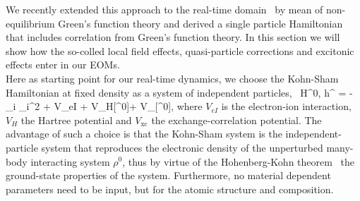 We recently extended this approach to the real-time domain~\cite{attaccalite} by mean of non-equilibrium Green's function theory and derived a single particle Hamiltonian that includes correlation from Green's function theory. %
In this section we will show how the so-colled local field effects, quasi-particle corrections and excitonic effects enter in our EOMs.\\
Here as starting point for our real-time dynamics, we choose the Kohn-Sham  Hamiltonian at fixed density as a system of independent particles,~\cite{PhysRev.140.A1133} 
\be
\hat H^{0,} \equiv \hat h^{} = -\sum_{i} \nabla_i^2 + \hat V_{eI} + \hat V_{H}[\rho^0]+ \hat V_{}[\rho^0],      
\label{eq:HIPA}
\ee
where $V_{eI}$ is the electron-ion interaction, $V_{H}$ the Hartree potential and $V_{\text{xc}}$ the exchange-correlation potential.
The advantage of such a choice is that the Kohn-Sham system is the independent-particle system that reproduces the electronic density of the unperturbed many-body interacting system $\rho^0$, thus by virtue of the Hohenberg-Kohn theorem~\cite{PhysRev.136.B864} the ground-state properties of the system. Furthermore, no material dependent parameters need to be input, but for the atomic structure and composition. 

